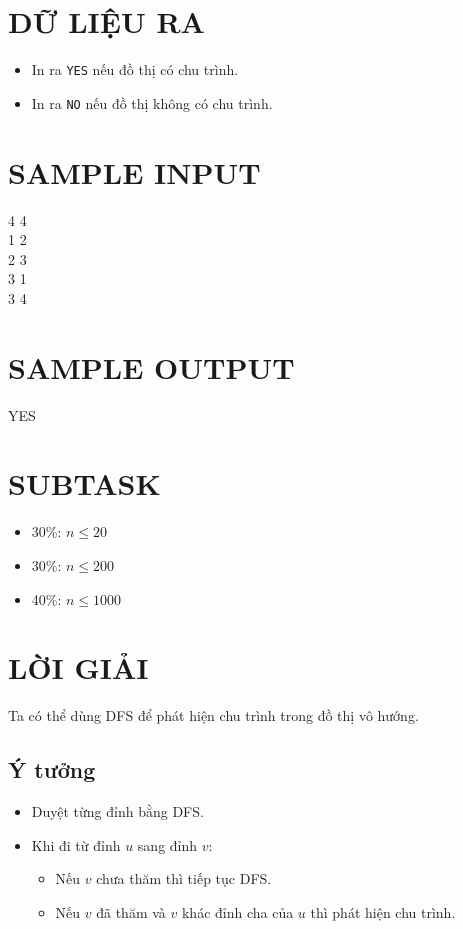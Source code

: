 \documentclass[a4paper,12pt]{article}
\begin{document}
\section*{DỮ LIỆU RA}
\begin{itemize}
    \item In ra \texttt{YES} nếu đồ thị có chu trình.
    \item In ra \texttt{NO} nếu đồ thị không có chu trình.
\end{itemize}

\section*{SAMPLE INPUT}
\begin{tcolorbox}
4 4 \\
1 2 \\
2 3 \\
3 1 \\
3 4
\end{tcolorbox}

\section*{SAMPLE OUTPUT}
\begin{tcolorbox}
YES
\end{tcolorbox}

\section*{SUBTASK}
\begin{itemize}
    \item 30\%: $n \le 20$
    \item 30\%: $n \le 200$
    \item 40\%: $n \le 1000$
\end{itemize}

\section*{LỜI GIẢI}

Ta có thể dùng DFS để phát hiện chu trình trong đồ thị vô hướng.

\subsection*{Ý tưởng}
\begin{itemize}
    \item Duyệt từng đỉnh bằng DFS.
    \item Khi đi từ đỉnh $u$ sang đỉnh $v$:
    \begin{itemize}
        \item Nếu $v$ chưa thăm thì tiếp tục DFS.
        \item Nếu $v$ đã thăm và $v$ khác đỉnh cha của $u$ thì phát hiện chu trình.
    \end{itemize}
\end{itemize}
\end{document}
